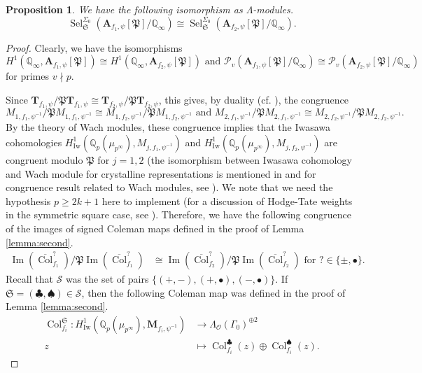 \documentclass{amsart}
\renewcommand{\geq}{\geqslant}
\newcommand{\HIw}{H^1_{\mathrm{Iw}}}
\newcommand{\Q}{\mathbb{Q}}
\newcommand{\fS}{\mathfrak{S}}
\newcommand{\bT}{\mathbf{T}}
\newcommand{\bA}{\mathbf{A}}
\newcommand{\bM}{\mathbf{M}}
\newcommand{\col}{\operatorname{Col}}
\newcommand{\im}{\operatorname{Im}}
\newcommand{\Sel}{\operatorname{Sel}}
\renewcommand{\O}{\mathcal{O}}
\newtheorem{auxiliary proposition}[theorem]{Auxiliary Proposition}
\newtheorem{main conjecture}[theorem]{Main Conjecture}
\newtheorem{main theorem}[theorem]{Main Theorem}
\newtheorem{modesty proposition}[theorem]{Modesty Proposition}
\newtheorem{open problem}[theorem]{Open Problem}
\newtheorem{proposition}[theorem]{Proposition}
\newtheorem{convergence lemma}[theorem]{Convergence Lemma}
\newtheorem{corrected lemma}[theorem]{Corrected Lemma}
\newtheorem{growth lemma}[theorem]{Growth Lemma}
\newtheorem{coefficient lemma}[theorem]{Integrality Lemma}
\newtheorem{interpolation lemma}[theorem]{Interpolation Lemma}
\newtheorem{kernel lemma}[theorem]{Kernel Lemma}
\newtheorem{limit lemma}[theorem]{Limit Lemma}
\newtheorem{tandem lemma}[theorem]{Modesty Lemma}
\newtheorem{zero-finding lemma}[theorem]{Zero-Finding Lemma}
\begin{document}
\begin{proposition}\label{prop:congprop}
    We have the following isomorphism as $\Lambda$-modules.
    $$\Sel_{\fS}^{\Sigma_0}(\bA_{f_1, \psi}[\mathfrak{P}]/\Q_\infty)\cong \Sel_{\fS}^{\Sigma_0}(\bA_{f_2, \psi}[\mathfrak{P}]/\Q_\infty).$$
\end{proposition}
\begin{proof}
    Clearly, we have the isomorphisms 
    $$H^1(\Q_\infty,\bA_{f_1, \psi}[\mathfrak{P}]) \cong  H^1(\Q_\infty,\bA_{f_2, \psi}[\mathfrak{P}]) \text{ and }\mathcal{P}_v(\bA_{f_1, \psi}[\mathfrak{P}]/\Q_\infty) \cong \mathcal{P}_v(\bA_{f_2, \psi}[\mathfrak{P}]/\Q_\infty)$$ for primes $v \nmid p$.
    \vspace{.2cm}
    
    
   
    Since $\bT_{f_1,\psi}/\mathfrak{P}\bT_{f_1,\psi} \cong \bT_{f_2,\psi}/\mathfrak{P}\bT_{f_2,\psi}$, this gives, by duality (cf. \cite[page 23, line 3]{BLV}),  the congruence $$M_{1,f_1, \psi^{-1}} /\mathfrak{P} M_{1,f_1, \psi^{-1}} \cong M_{1,f_2, \psi^{-1}} /\mathfrak{P} M_{1,f_2, \psi^{-1}} \text{ and } M_{2,f_1, \psi^{-1}} /\mathfrak{P} M_{2,f_1, \psi^{-1}} \cong M_{2,f_2, \psi^{-1}} /\mathfrak{P} M_{2,f_2, \psi^{-1}}.$$
    By the theory of Wach modules, these congruence implies that the Iwasawa cohomologies $\HIw(\Q_p(\mu_{p^\infty}),M_{j,f_1, \psi^{-1}})$ and $\HIw(\Q_p(\mu_{p^\infty}),M_{j,f_2, \psi^{-1}})$  are congruent modulo $\mathfrak{P}$ for $j=1,2$ (the isomorphism between Iwasawa cohomology and Wach module for crystalline representations is mentioned in \cite[Section 2.2, Section 2.3]{LLZ0} and for congruence result related to Wach modules, see \cite[Theorem IV.1.1]{berger04}). We note that we need the hypothesis $p\geq 2k+1$ here to implement \cite[Theorem IV.1.1]{berger04} (for a discussion of Hodge-Tate weights in the symmetric square case, see  \cite[last line in page 25, page 26]{BLV}). Therefore, we have the following congruence of the images of signed Coleman maps defined in the proof of Lemma \ref{lemma:second}.
    \begin{align}
       \im(\overline{\col}_{f_1}^?)/\mathfrak{P}\im(\overline{\col}_{f_1}^?)&\cong \im(\overline{\col}_{f_2}^?)/\mathfrak{P}\im(\overline{\col}_{f_2}^?) \text{ for } ?\in \{\pm,\bullet\}. \label{eq:align1} 
    \end{align}
    Recall that $\mathcal{S}$ was the set of pairs $\{(+,-),(+,\bullet), (-,\bullet)\}.$ If $\fS = (\clubsuit, \spadesuit) \in \mathcal{S}$,
    then the following Coleman map was defined in the proof of Lemma \ref{lemma:second}.
    \begin{align*}
       \col_{f_i}^{\fS}:\HIw(\Q_p(\mu_{p^\infty}), \bM_{f_i, \psi^{-1}}) &\rightarrow \Lambda_{\O}(\Gamma_0)^{\oplus 2} \\
       z &\mapsto \col_{f_i}^{\clubsuit} (z)\oplus \col_{f_i}^{\spadesuit} (z).
    \end{align*}
 


\end{proof}
\end{document}
